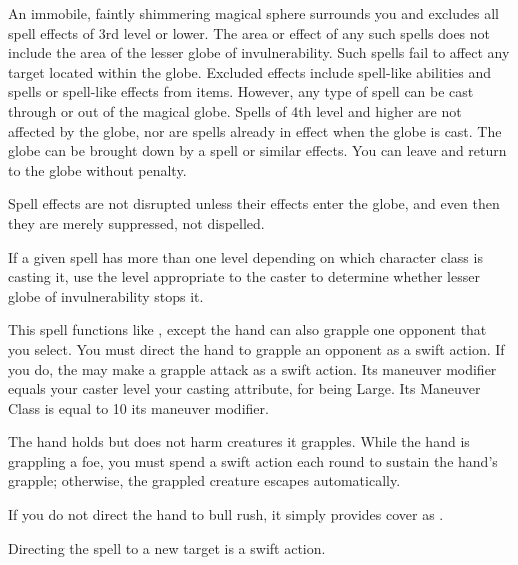 \begin{spelleffect}
  An immobile, faintly shimmering magical sphere surrounds you and excludes all spell effects of 3rd level or lower. The area or effect of any such spells does not include the area of the lesser globe of invulnerability. Such spells fail to affect any target located within the globe. Excluded effects include spell-like abilities and spells or spell-like effects from items. However, any type of spell can be cast through or out of the magical globe. Spells of 4th level and higher are not affected by the globe, nor are spells already in effect when the globe is cast. The globe can be brought down by a  spell or similar effects. You can leave and return to the globe without penalty.
\end{spelleffect}
\begin{spellnotes}
  Spell effects are not disrupted unless their effects enter the globe, and even then they are merely suppressed, not dispelled. 
  \par If a given spell has more than one level depending on which character class is casting it, use the level appropriate to the caster to determine whether lesser globe of invulnerability stops it.
\end{spellnotes}

\begin{spelleffect}
  This spell functions like , except the hand can also grapple one opponent that you select. You must direct the hand to grapple an opponent as a swift action. If you do, the  may make a grapple attack as a swift action. Its maneuver modifier equals your caster level \add your casting attribute,  for being Large. Its Maneuver Class is equal to 10 \add its maneuver modifier.
  \par The hand holds but does not harm creatures it grapples. While the hand is grappling a foe, you must spend a swift action each round to sustain the hand's grapple; otherwise, the grappled creature escapes automatically.
  \par If you do not direct the hand to bull rush, it simply provides cover as .
\end{spelleffect}
\begin{spellnotes}
  Directing the spell to a new target is a swift action.
\end{spellnotes}


